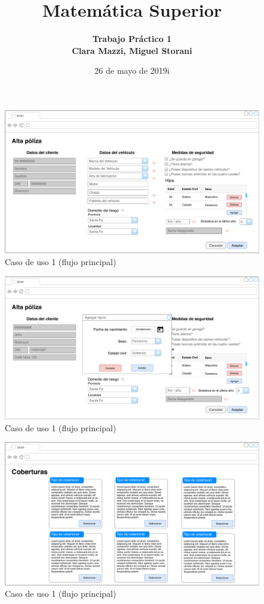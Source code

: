 \documentclass[12pt]{article}
\title{Matemática Superior}
\author{\bfseries{Trabajo Práctico 1}\\
Clara Mazzi, Miguel Storani}
\date{26 de mayo de 2019i}
\begin{document}
\pagestyle{empty}		
\begin{titlepage}

\center
\end{titlepage}
\newpage
\pagestyle{fancy}


\vfill
\begin{figure}[h!]
\includegraphics[width=\textwidth]{CU1/CU-011.pdf}
\caption{Caso de uso 1 (flujo principal)}
\end{figure}
\vfill

\vfill
\begin{figure}[h!]
\includegraphics[width=\textwidth]{CU1/CU-012.pdf}
\caption{Caso de uso 1 (flujo principal)}
\end{figure}
\vfill

\vfill
\begin{figure}[h!]
\includegraphics[width=\textwidth]{CU1/CU-013.pdf}
\caption{Caso de uso 1 (flujo principal)}
\end{figure}
\vfill
\end{document}
